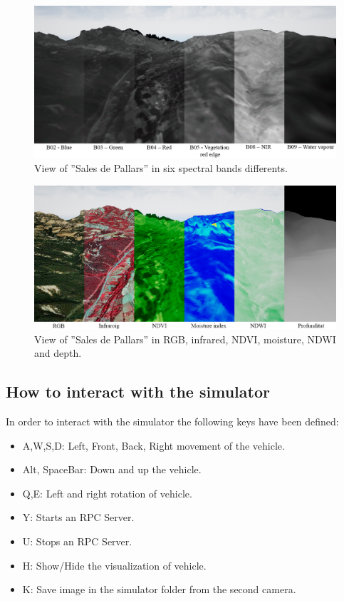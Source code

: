 \documentclass[10pt,a4paper,twocolumn,twoside]{article}
\begin{document}
\begin{figure}[!h]
\centering
  	\includegraphics[width=1\textwidth]{multispectral/bands}
	\caption{View of ''Sales de Pallars'' in six spectral bands differents.}
	\label{fig-bands}
\end{figure}

\begin{figure}[!h]
\centering
  	\includegraphics[width=1\textwidth]{multispectral/spectralindexes}
	\caption{View of ''Sales de Pallars'' in RGB, infrared, NDVI, moisture, NDWI and depth.}
	\label{fig-spectralindexes}
\end{figure}

\subsection{How to interact with the simulator}
In order to interact with the simulator the following keys have been defined:

\begin{itemize}
\item A,W,S,D: Left, Front, Back, Right movement of the vehicle.
\item Alt, SpaceBar: Down and up the vehicle.
\item Q,E: Left and right rotation of vehicle.
\item Y: Starts an RPC Server.
\item U: Stops an RPC Server.
\item H: Show/Hide the visualization of vehicle.
\item K: Save image in the simulator folder from the second camera.
\end{itemize}
\end{document}
